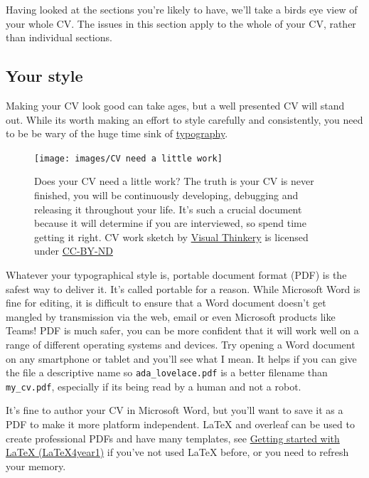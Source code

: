 \documentclass[
]{book}
\begin{document}
Having looked at the sections you're likely to have, we'll take a birds eye view of your whole CV. The issues in this section apply to the whole of your CV, rather than individual sections.

\hypertarget{pdf}{%
\subsection{Your style}\label{pdf}}

Making your CV look good can take ages, but a well presented CV will stand out. While its worth making an effort to style carefully and consistently, you need to be be wary of the huge time sink of \href{https://en.wikipedia.org/wiki/Typography}{typography}.

\begin{figure}

{\centering \texttt{[image: images/CV need a little work]} 

}

\caption{Does your CV need a little work? The truth is your CV is never finished, you will be continuously developing, debugging and releasing it throughout your life. It's such a crucial document because it will determine if you are interviewed, so spend time getting it right. CV work sketch by \href{https://visualthinkery.com}{Visual Thinkery} is licensed under \href{https://creativecommons.org/licenses/by-nd/4.0/}{CC-BY-ND}}\label{fig:cvwork-fig}
\end{figure}



Whatever your typographical style is, portable document format (PDF) is the safest way to deliver it. It's called portable for a reason. While Microsoft Word is fine for editing, it is difficult to ensure that a Word document doesn't get mangled by transmission via the web, email or even Microsoft products like Teams! PDF is much safer, you can be more confident that it will work well on a range of different operating systems and devices. Try opening a Word document on any smartphone or tablet and you'll see what I mean. It helps if you can give the file a descriptive name so \texttt{ada\_lovelace.pdf} is a better filename than \texttt{my\_cv.pdf}, especially if its being read by a human and not a robot. 🤖

It's fine to author your CV in Microsoft Word, but you'll want to save it as a PDF to make it more platform independent. LaTeX and overleaf can be used to create professional PDFs and have many templates, see \href{https://latex4year1.netlify.app/}{Getting started with LaTeX (LaTeX4year1)} if you've not used LaTeX before, or you need to refresh your memory. \citep{latex4year1}
\end{document}
